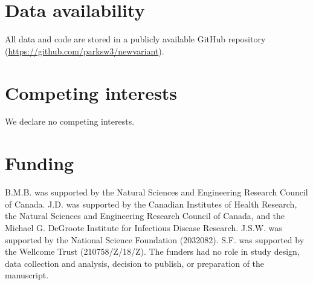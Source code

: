 \documentclass[12pt]{article}
\begin{document}
\section*{Data availability}

All data and code are stored in a publicly available GitHub repository (\url{https://github.com/parksw3/newvariant}).

\section*{Competing interests}

We declare no competing interests.

\section*{Funding}

B.M.B. was supported by the Natural Sciences and Engineering Research Council of Canada. 
J.D. was supported by the Canadian Institutes of Health Research, 
the Natural Sciences and Engineering Research Council of Canada, 
and the Michael G. DeGroote Institute for Infectious Disease Research.
J.S.W. was supported by the National Science Foundation (2032082).
S.F. was supported by the Wellcome Trust (210758/Z/18/Z).
The funders had no role in study design, data collection and analysis, decision to publish, or preparation of the manuscript.

\pagebreak


\end{document}

